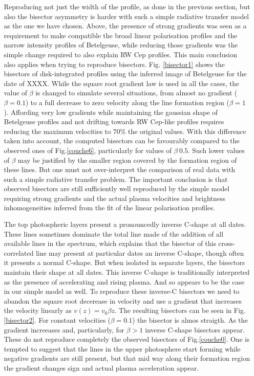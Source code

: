 \documentclass{/Users/art2/TeX/aanda/aa}
\begin{document}
Reproducing not just the width of the profile, as done in the previous section, but also the bisector asymmetry is harder with such 
a simple radiative transfer model as the one  we  have chosen. Above, the presence of strong gradients was seen as a requirement to make 
compatible the broad linear polarisation profiles and the narrow intensity profiles of Betelgeuse, while reducing those gradients was the
simple change  required to also explain RW Cep profiles. This main conclusion also applies when trying to reproduce bisectors.
 Fig. \ref{bisector1} shows 
the bisectors of disk-integrated profiles using the inferred image of Betelgeuse for the date of XXXX. While the square root gradient law
is used in all the cases, the value of $\beta$ is changed to simulate several situations, from almost no gradient ($\beta=0.1$) to a
 full decrease to zero  velocity along the line formation region ($\beta=1$). Affording very low gradients while maintaining the gaussian shape 
 of Betelgeuse profiles and not drifting towards 
RW Cep-like profiles requires reducing the maximum velocities to 70\% the original values. With this difference taken into account, 
the computed bisectors can be favourably compared to the observed ones of Fig.\ref{couche6}, particularly for values of $\beta~0.5$. 
Such lower values of $\beta$ may be justified by the smaller region covered by the formation region of these lines. But one must 
not over-interpret the comparison of real data with such a simple radiative transfer problem. The important conclusion is that 
observed bisectors are still sufficiently well reproduced by the simple model requiring strong gradients and the actual plasma velocities 
and brightness inhomogeneities inferred from the fit of the linear polarisation profiles. 

The top photospheric layers present a pronouncedly inverse C-shape at all dates. These lines sometimes dominate the total line 
made of the addition of all available lines in the spectrum, which explains that the bisector of this cross-correlated line may present
at particular dates an inverse C-shape,
though often it  presents a normal C-shape. But when isolated in separate layers, the bisectors maintain their shape at all dates. This inverse 
C-shape  is traditionally interpreted as the presence of accelerating and rising plasma. And so appears to be the case in our simple model 
as well. To reproduce these inverse-C bisectors we need to abandon the square root decerease in velocity and use a gradient that increases 
the velocity linearly as $v(z)=v_0\beta z$. The resulting bisectors can be seen in  Fig. \ref{bisector2}. For constant velocities 
($\beta=0.1$) the bisector is almos straigth. As the gradient increeases and, particularly, for $\beta >1$ inverse C-shape bisectors 
appear. These do not reproduce completely the observed bisectors of Fig.\ref{couche0}. One is tempted to suggest that the lines 
  in the upper photosphere start forming while negative gradients are still present, but that mid way along their formation region the gradient 
  changes sign and actual plasma acceleration appear. 
\end{document}
